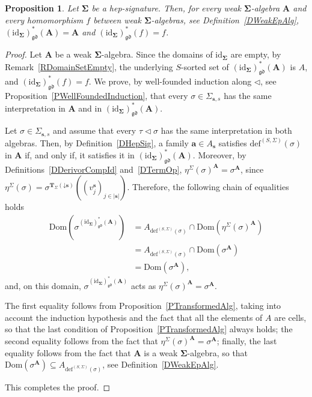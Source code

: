 \documentclass[a4paper, reqno]{amsbook}
\newcommand{\bb}[1]{\ensuremath{\lvert #1 \rvert}}
\newcommand{\vs}[1]{\mathbin{\downarrow}#1}
\newcommand{\sig}[1]{\mathbf{#1}}             %
\newcommand{\Dom}{\mathrm{Dom}}
\newcommand{\gd}{\mathfrak{gd}}              %
\newcommand{\id}{\mathrm{id}}
\theoremstyle{plain}
\newtheorem{proposition}[theorem]{Proposition}
\theoremstyle{definition}
\begin{document}
\begin{proposition}\label{PGenHepDerivorId}
Let $\sig{\Sigma}$ be a hep-signature.
Then, for every weak $\sig{\Sigma}$-algebra $\mathbf{A}$ and every homomorphism $f$ between weak $\sig{\Sigma}$-algebras, see Definition~\ref{DWeakEpAlg}, $(\id_{\sig{\Sigma}})^{\ast}_{\gd}(\mathbf{A})=\mathbf{A}$ and $(\id_{\sig{\Sigma}})^{\ast}_{\gd}(f)=f$.
\end{proposition}
\begin{proof}
Let $\mathbf{A}$ be a weak $\sig{\Sigma}$-algebra.
Since the domains of $\id_{\sig{\Sigma}}$ are empty, by Remark~\ref{RDomainSetEmpty}, the underlying $S$-sorted set of $(\id_{\sig{\Sigma}})^{\ast}_{\gd}(\mathbf{A})$ is $A$, and $(\id_{\sig{\Sigma}})^{\ast}_{\gd}(f)=f$.
We prove, by well-founded induction along $\lhd$, see Proposition~\ref{PWellFoundedInduction}, that every $\sigma\in\Sigma_{\mathbf{s},s}$ has the same interpretation in $\mathbf{A}$ and in $(\id_{\sig{\Sigma}})^{\ast}_{\gd}(\mathbf{A})$.

Let $\sigma\in\Sigma_{\mathbf{s},s}$ and assume that every $\tau\lhd\sigma$ has the same interpretation in both algebras.
Then, by Definition~\ref{DHepSig}, a family $\mathbf{a}\in A_{\mathbf{s}}$ satisfies $\mathrm{def}^{(S,\Sigma)}(\sigma)$ in $\mathbf{A}$ if, and only if, it satisfies it in $(\id_{\sig{\Sigma}})^{\ast}_{\gd}(\mathbf{A})$.
Moreover, by Definitions~\ref{DDerivorCompId} and~\ref{DTermOp}, $\eta^{\Sigma}(\sigma)^{\mathbf{A}}=\sigma^{\mathbf{A}}$, since $\eta^{\Sigma}(\sigma)=\sigma^{\mathbf{T}_{\Sigma}(\vs{\mathbf{s}})}((v^{\mathbf{s}}_{j})_{j\in\bb{\mathbf{s}}})$.
Therefore, the following chain of equalities holds
\begin{align*}
\Dom\left(\sigma^{(\id_{\sig{\Sigma}})^{\ast}_{\gd}(\mathbf{A})}\right)
&=
A_{\mathrm{def}^{(S,\Sigma)}(\sigma)}\cap\Dom\left(\eta^{\Sigma}(\sigma)^{\mathbf{A}}\right)
\tag{1}
\\&=
A_{\mathrm{def}^{(S,\Sigma)}(\sigma)}\cap\Dom\left(\sigma^{\mathbf{A}}\right)
\tag{2}
\\&=
\Dom\left(\sigma^{\mathbf{A}}\right),
\tag{3}
\end{align*}
and, on this domain, $\sigma^{(\id_{\sig{\Sigma}})^{\ast}_{\gd}(\mathbf{A})}$ acts as $\eta^{\Sigma}(\sigma)^{\mathbf{A}}=\sigma^{\mathbf{A}}$.

The first equality follows from Proposition~\ref{PTransformedAlg}, taking into account the induction hypothesis and the fact that all the elements of $A$ are cells, so that the last condition of Proposition~\ref{PTransformedAlg} always holds; the second equality follows from the fact that $\eta^{\Sigma}(\sigma)^{\mathbf{A}}=\sigma^{\mathbf{A}}$; finally, the last equality follows from the fact that $\mathbf{A}$ is a weak $\sig{\Sigma}$-algebra, so that $\Dom(\sigma^{\mathbf{A}})\subseteq A_{\mathrm{def}^{(S,\Sigma)}(\sigma)}$, see Definition~\ref{DWeakEpAlg}.

This completes the proof.
\end{proof}
\end{document}
